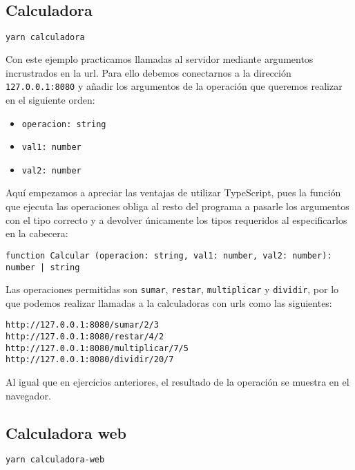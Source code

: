 \subsection{Calculadora}

\begin{lstlisting}[language=sh]
yarn calculadora
\end{lstlisting}

Con este ejemplo practicamos llamadas al servidor mediante argumentos incrustrados en la url.
Para ello debemos conectarnos a la dirección \texttt{127.0.0.1:8080} y añadir los argumentos de la operación que queremos realizar en el siguiente orden:

\begin{itemize}
	\item
		\texttt{operacion: string}
	\item
		\texttt{val1: number}
	\item
		\texttt{val2: number}
\end{itemize}

Aquí empezamos a apreciar las ventajas de utilizar TypeScript, pues la función que ejecuta las operaciones obliga al resto del programa a pasarle los argumentos con el tipo correcto y a devolver únicamente los tipos requeridos al especificarlos en la cabecera:

\begin{lstlisting}
function Calcular (operacion: string, val1: number, val2: number): number | string
\end{lstlisting}

\pagebreak

Las operaciones permitidas son \texttt{sumar}, \texttt{restar}, \texttt{multiplicar} y \texttt{dividir}, por lo que podemos realizar llamadas a la calculadoras con urls como las siguientes:

\begin{lstlisting}
http://127.0.0.1:8080/sumar/2/3
http://127.0.0.1:8080/restar/4/2
http://127.0.0.1:8080/multiplicar/7/5
http://127.0.0.1:8080/dividir/20/7
\end{lstlisting}

Al igual que en ejercicios anteriores, el resultado de la operación se muestra en el navegador.

\subsection{Calculadora web}

\begin{lstlisting}[language=sh]
yarn calculadora-web
\end{lstlisting}

